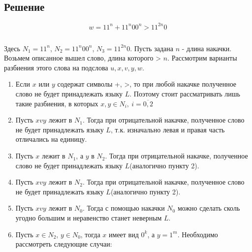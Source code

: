 \documentclass[a4paper, 14pt]{article}
\begin{document}
\subsection{Решение}

$$
w =  11^n + 11^n00^n > 11^{2n}0
$$

$$
$$


Здесь $N_1 = 11^n$, $N_2 = 11^n00^n$, $N_3 = 11^{2n}0$.
Пусть задана $n$ - длина накачки. Возьмем описанное вышел слово, длина которого > $n$.
Рассмотрим варианты разбиения этого слова на подслова $u, x, v ,y, w$.


\begin{enumerate}

	\item{
			Если $x$ или $y$ содержат символы +, >, то при любой накачке полученное слово не будет принадлежать языку $L$. Поэтому стоит рассматривать лишь такие разбиения, в которых $x, y \in N_i, \ i=\overline{0,2}$
		}
    \item{
			Пусть $xvy$ лежит в $N_1$. Тогда при отрицательной накачке, полученное слово не будет принадлежать языку $L$, т.к. изначально левая и правая часть отличались на единицу.
		}
	\item{
			Пусть $x$ лежит в $N_1$, а $y$ в $N_2$. Тогда при отрицательной накачке, полученное слово не будет принадлежать языку $L$(аналогично пункту 2).
		}	
	\item{
			Пусть $xvy$ лежит в $N_2$. Тогда при отрицательной накачке, полученное слово не будет принадлежать языку $L$(аналогично пункту 2).
		}
	\item{
			Пусть $xvy$ лежит в $N_0$. Тогда с помощью накачки $N_0$ можно сделать сколь угодно большим и неравенство станет неверным $L$.
		}

	\item{
			Пусть $x \in N_2$, $y \in N_0$, тогда $x$ имеет вид $0^k$, а $y = 1^m$. Необходимо рассмотреть следующие случаи:
			
}
\end{enumerate}
\end{document}

